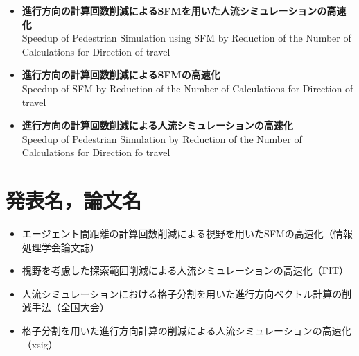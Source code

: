 \begin{itemize}
\item \textbf{進行方向の計算回数削減によるSFMを用いた人流シミュレーションの高速化}\\
        Speedup of Pedestrian Simulation using SFM by Reduction of the Number of Calculations for Direction of travel
\item \textbf{進行方向の計算回数削減によるSFMの高速化}\\
        Speedup of SFM by Reduction of the Number of Calculations for Direction of travel
\item \textbf{進行方向の計算回数削減による人流シミュレーションの高速化}\\
        Speedup of Pedestrian Simulation by Reduction of the Number of Calculations for Direction fo travel
\end{itemize}


\section{発表名，論文名}

\begin{itemize}
\item エージェント間距離の計算回数削減による視野を用いたSFMの高速化（情報処理学会論文誌）
\item 視野を考慮した探索範囲削減による人流シミュレーションの高速化（FIT）
\item 人流シミュレーションにおける格子分割を用いた進行方向ベクトル計算の削減手法（全国大会）
\item 格子分割を用いた進行方向計算の削減による人流シミュレーションの高速化（xsig）
\end{itemize}

